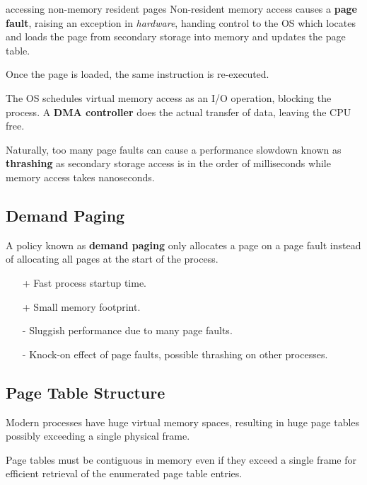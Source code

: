 \begin{enumerate}
\end{enumerate}

\begin{defn}{accessing non-memory resident pages}
    Non-resident memory access causes a \textbf{page fault}, raising an exception in \textit{hardware}, handing control to the OS which locates and loads the page from secondary storage into memory and updates the page table.

    Once the page is loaded, the same instruction is re-executed.
\end{defn}

The OS schedules virtual memory access as an I/O operation, blocking the process.
A \textbf{DMA controller} does the actual transfer of data, leaving the CPU free.

Naturally, too many page faults can cause a performance slowdown known as \textbf{thrashing} as secondary storage access is in the order of milliseconds while memory access takes nanoseconds.


\subsection{Demand Paging}

A policy known as \textbf{demand paging} only allocates a page on a page fault instead of allocating all pages at the start of the process.

\begin{itemize}
    \item[+] Fast process startup time.
    \item[+] Small memory footprint.
    \item[-] Sluggish performance due to many page faults.
    \item[-] Knock-on effect of page faults, possible thrashing on other processes.
\end{itemize}


\subsection{Page Table Structure}
Modern processes have huge virtual memory spaces, resulting in huge page tables possibly exceeding a single physical frame.

Page tables must be contiguous in memory even if they exceed a single frame for efficient retrieval of the enumerated page table entries.

